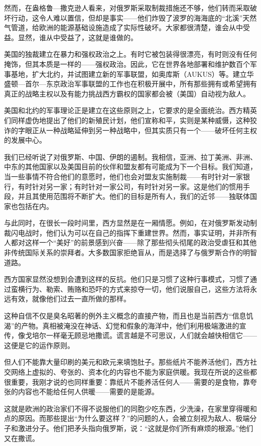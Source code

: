 \documentclass[UTF8, 11pt, oneside]{ctexart}
\begin{document}
然而，在盎格鲁—撒克逊人看来，对俄罗斯采取制裁措施还不够，他们转而采取破坏行动，这令人难以置信，但却是事实——他们炸毁了波罗的海海底的“北溪”天然气管道，给欧洲的能源基础设施造成了实际性破坏。大家都很清楚，谁会从中受益。显然，谁从中受益了，这就是谁做的。

美国的独裁建立在暴力和强权政治之上。有时它被包装得很漂亮，有时则没有任何掩饰，但其本质是一样的——强权政治。因此，它在世界各地部署和维护数百个军事基地，扩大北约，并试图建立新的军事联盟，如奥库斯（AUKUS）等。建立华盛顿—首尔—东京政治军事联盟的工作也在积极开展中，所有那些拥有或希望拥有真正的战略主权以及有能力挑战西方霸权的国家都会被（美国）自动视为敌人。

美国和北约的军事理论正是建立在这些原则之上，它要求的是全面统治。西方精英们同样虚伪地提出了他们的新殖民计划，他们宣称和平，实则是某种威慑，这种狡诈的字眼正从一种战略延伸到另一种战略中，但其实质只有一个——破坏任何主权的发展中心。

我们已经听说了对俄罗斯、中国、伊朗的遏制。我相信，亚洲、拉丁美洲、非洲、中东的其他国家以及美国目前的伙伴和盟友都有可能成为下一个目标。我们知道，当一些事情不符合他们的意愿时，他们也会对盟友实施制裁——有时针对一家银行，有时针对另一家；有时针对一家公司，有时针对另一家。这是他们的惯用手段，并且其使用范围将不断扩大。他们的目标是所有人，我们的近邻——独联体国家也包括在内。

与此同时，在很长一段时间里，西方显然是在一厢情愿。例如，在对俄罗斯发动制裁闪电战时，他们认为可以在自己的指挥下重建世界。然而，事实证明，并非所有人都对这样一个“美好”的前景感到兴奋——除了那些彻头彻尾的政治受虐狂和其他非传统国际关系的崇拜者。大多数国家拒绝盲从，而是选择了与俄罗斯合作的明智道路。

西方国家显然没想到会遭到这样的反抗。他们只是习惯了这种行事模式，习惯了通过蛮横行为、勒索、贿赂和恐吓的方式来掠夺一切，他们说服自己，这些方法将永远有效，就像他们过去一直所做的那样。

这种自信不仅是臭名昭著的例外主义概念的直接产物，而且也是当前西方“信息饥渴”的产物。真相被淹没在神话、幻觉和假象的海洋中，他们利用极端激进的宣传，像戈培尔一样毫无顾忌地撒谎。谎言越是不可思议，人们就会越快相信它——这便是它的运作原则。

但人们不能靠大量印刷的美元和欧元来填饱肚子。那些纸片不能养活他们，西方社交网络上虚拟的、夸张的、资本化的内容也不能为家庭供暖。我现在所说的这些都很重要，我刚才说的也同样重要：靠纸片不能养活任何人——需要的是食物，靠夸张的内容也不能给任何人供暖——需要的是能源。

这就是欧洲的政治家们不得不说服他们的同胞少吃东西，少洗澡，在家里穿得暖和点的原因。而那些提出“为什么要这样？”的问题的人，会被立刻视为敌人、极端分子和激进分子。他们把矛头指向俄罗斯，说：“这就是你们所有麻烦的根源。”他们又在撒谎。
\end{document}
